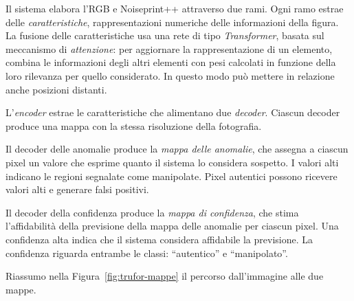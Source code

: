 Il sistema elabora l'RGB e Noiseprint++ attraverso due rami. Ogni ramo estrae delle \emph{caratteristiche}, rappresentazioni numeriche delle informazioni della figura. La fusione delle caratteristiche usa una rete di tipo \emph{Transformer}, basata sul meccanismo di \emph{attenzione}: per aggiornare la rappresentazione di un elemento, combina le informazioni degli altri elementi con pesi calcolati in funzione della loro rilevanza per quello considerato. In questo modo può mettere in relazione anche posizioni distanti.

L'\emph{encoder} estrae le caratteristiche che alimentano due \emph{decoder}. Ciascun decoder produce una mappa con la stessa risoluzione della fotografia.

Il decoder delle anomalie produce la \emph{mappa delle anomalie}, che assegna a ciascun pixel un valore che esprime quanto il sistema lo considera sospetto. I valori alti indicano le regioni segnalate come manipolate. Pixel autentici possono ricevere valori alti e generare falsi positivi.

Il decoder della confidenza produce la \emph{mappa di confidenza}, che stima l'affidabilità della previsione della mappa delle anomalie per ciascun pixel. Una confidenza alta indica che il sistema considera affidabile la previsione. La confidenza riguarda entrambe le classi: ``autentico'' e ``manipolato''.

Riassumo nella Figura~\ref{fig:trufor-mappe} il percorso dall'immagine alle due mappe.

